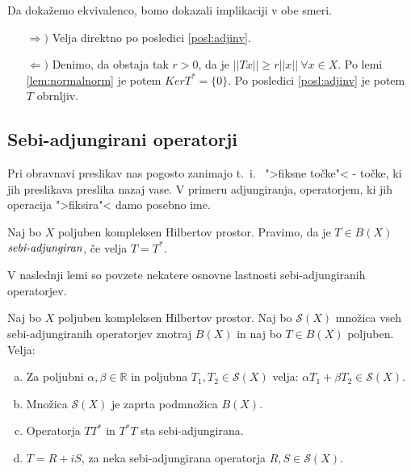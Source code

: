 \documentclass[mat2]{matdelo}
\newcommand{\R}{\mathbb{R}}
\newcommand{\abs}[1]{\ensuremath{\lvert #1 \rvert}}
\newcommand{\norm}[1]{\abs{\abs{#1}}}
\newcommand{\pojem}[1]{\ensuremath{\emph{#1}}}
\begin{document}
			\begin{dokaz}
				Da dokažemo ekvivalenco, bomo dokazali implikaciji v obe smeri.
				\begin{itemize}
					\item[$\Rightarrow)$] Velja direktno po posledici \ref{posl:adjinv}.
					\item[$\Leftarrow)$] Denimo, da obstaja tak $r>0$, da je $\norm{Tx} \geq r\norm{x}~\forall x\in X$. Po lemi \ref{lem:normalnorm} je potem $KerT^* = \{0\}$. Po posledici \ref{posl:adjinv} je potem $T$ obrnljiv.
				\end{itemize}
			\end{dokaz}
			\subsection{Sebi-adjungirani operatorji}
			Pri obravnavi preslikav nas pogosto zanimajo t.~i.~ ">fiksne točke"< - točke, ki jih preslikava preslika nazaj vase. V primeru adjungiranja, operatorjem, ki jih operacija ">fiksira"< damo posebno ime.
			\begin{definicija}
				\label{def:sebiadjop}
				Naj bo $X$ poljuben kompleksen Hilbertov prostor. Pravimo, da je $T\in B(X)$ \pojem{sebi-adjungiran}, če velja $T = T^*$.
			\end{definicija}
			V naslednji lemi so povzete nekatere osnovne lastnosti sebi-adjungiranih operatorjev.
			\begin{lema}
				\label{lem:sebiadjlast}
				Naj bo $X$ poljuben kompleksen Hilbertov prostor. Naj bo $\mathcal{S}(X)$ množica vseh sebi-adjungiranih operatorjev znotraj $B(X)$ in naj bo $T\in B(X)$ poljuben. Velja:
				\begin{enumerate}[a)]
					\item Za poljubni $\alpha, \beta \in \R$ in poljubna $T_1, T_2 \in \mathcal{S}(X)$ velja: $\alpha T_1 + \beta T_2 \in \mathcal{S}(X)$.
					\item Množica $\mathcal{S}(X)$ je zaprta podmnožica $B(X)$.
					\item Operatorja $TT^*$ in $T^*T$ sta sebi-adjungirana.
					\item $T = R + iS$, za neka sebi-adjungirana operatorja $R, S \in \mathcal{S}(X)$.
				\end{enumerate}
			\end{lema}
\end{document}
